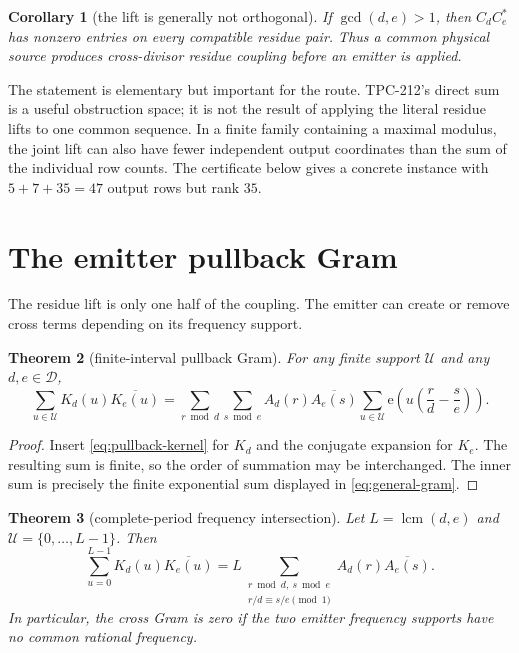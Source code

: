 \documentclass[11pt]{article}
\newtheorem{theorem}{Theorem}[section]
\newtheorem{corollary}[theorem]{Corollary}
\theoremstyle{definition}
\theoremstyle{remark}
\newcommand{\Dd}{\mathcal D}
\newcommand{\UU}{\mathcal U}
\newcommand{\ee}{\mathrm e}
\begin{document}
\begin{corollary}[the lift is generally not orthogonal]
\label{cor:lift-nonorthogonal}
If $\gcd(d,e)>1$, then $C_dC_e^*$ has nonzero entries on every compatible
residue pair.  Thus a common physical source produces cross-divisor residue
coupling before an emitter is applied.
\end{corollary}

The statement is elementary but important for the route.  TPC-212's direct sum
is a useful obstruction space; it is not the result of applying the literal
residue lifts to one common sequence.  In a finite family containing a maximal
modulus, the joint lift can also have fewer independent output coordinates than
the sum of the individual row counts.  The certificate below gives a concrete
instance with $5+7+35=47$ output rows but rank $35$.

\section{The emitter pullback Gram}

The residue lift is only one half of the coupling.  The emitter can create or
remove cross terms depending on its frequency support.

\begin{theorem}[finite-interval pullback Gram]
\label{thm:general-gram}
For any finite support $\UU$ and any $d,e\in\Dd$,
\begin{equation}
 \sum_{u\in\UU}K_d(u)\overline{K_e(u)}
 =\sum_{r\bmod d}\sum_{s\bmod e}
 A_d(r)\overline{A_e(s)}
 \sum_{u\in\UU}\ee\!\left(u\left(\frac rd-\frac se\right)\right).
 \label{eq:general-gram}
\end{equation}
\end{theorem}

\begin{proof}
Insert \eqref{eq:pullback-kernel} for $K_d$ and the conjugate expansion for
$K_e$.  The resulting sum is finite, so the order of summation may be
interchanged.  The inner sum is precisely the finite exponential sum displayed
in \eqref{eq:general-gram}.
\end{proof}

\begin{theorem}[complete-period frequency intersection]
\label{thm:frequency-gram}
Let $L=\operatorname{lcm}(d,e)$ and $\UU=\{0,\ldots,L-1\}$.  Then
\begin{equation}
 \sum_{u=0}^{L-1}K_d(u)\overline{K_e(u)}
 =L\sum_{\substack{r\bmod d,\ s\bmod e\\r/d\equiv s/e\pmod 1}}
 A_d(r)\overline{A_e(s)}.
 \label{eq:frequency-gram}
\end{equation}
In particular, the cross Gram is zero if the two emitter frequency supports
have no common rational frequency.
\end{theorem}
\end{document}
